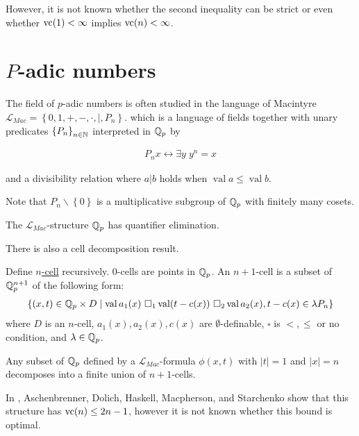 \documentclass{amsart}
\newcommand{\LLM}{\mathcal L_{Mac}}
\newcommand{\curly}[1]{\left\{#1\right\}}
\DeclareMathOperator{\vval}{val}
\newcommand{\defn}{\underline}
\begin{document}
However, it is not known whether the second inequality can be strict or even whether $\operatorname{vc}(1) < \infty$ implies $\operatorname{vc}(n) < \infty$.


\section{$P$-adic numbers}


The field of $p$-adic numbers is often studied in the language of Macintyre $\LLM = \curly{0, 1, +, -, \cdot, |, P_n}$.
which is a language of fields together with unary predicates $\curly{P_n}_{n \in \N} $ interpreted in $\mathbb{Q}_p$ by

\begin{align*}
  P_n x \leftrightarrow \exists y \; y^n = x
\end{align*}

and a divisibility relation where $a|b$ holds when $\vval a \leq \vval b$.

Note that $P_n\backslash \curly{0}$ is a multiplicative subgroup of $\mathbb{Q}_p$ with finitely many cosets.

\begin{Theorem} [Macintyre '76]
  The $\LLM$-structure $\mathbb{Q}_p$ has quantifier elimination.
\end{Theorem}

There is also a cell decomposition result.
\begin{Definition}
  Define \defn{$n$-cell} recursively.
  $0$-cells are points in $\mathbb{Q}_p$.
  An $n+1$-cell is a subset of $\mathbb{Q}_p^{n+1}$ of the following form:
  \begin{align*}
    \curly{(x, t) \in \Q_p \times D \mid \vval a_1(x) \ \square_1 \vval (t - c(x)) \ \square_2 \vval a_2(x), t - c(x) \in \lambda P_n}
  \end{align*}
  where $D$ is an $n$-cell,
  $a_1(x), a_2(x), c(x)$ are $\emptyset$-definable,
  $\square$ is $<, \leq$ or no condition, and
  $\lambda \in \mathbb{Q}_p$.    
\end{Definition}

\begin{Theorem} [Denef '84]
  Any subset of $\mathbb{Q}_p$ defined by a $\LLM$-formula $\phi(x, t)$ with $|t| = 1$ and $|x| = n$ decomposes into a finite union of $n+1$-cells.
\end{Theorem}  

In \cite{density}, Aschenbrenner, Dolich, Haskell, Macpherson, and Starchenko show that this structure has $\operatorname{vc}(n) \leq 2n - 1$,
however it is not known whether this bound is optimal.
\end{document}

